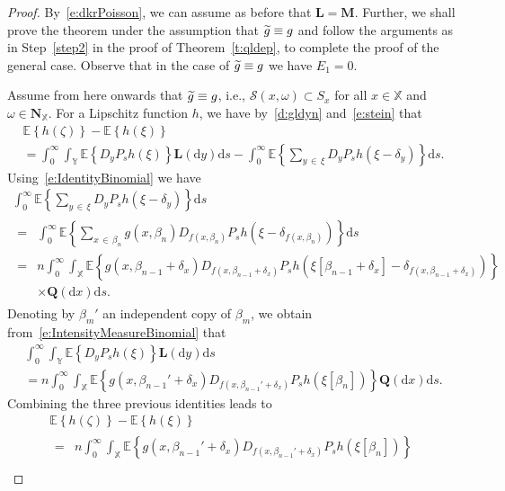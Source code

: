 \documentclass[AHL,Unicode,longabstracts]{cedram}
\newcommand*\bL{\mathbf{L}}
\newcommand*\bM{\mathbf{M}}
\newcommand*\bN{\mathbf{N}}
\newcommand{\bQ}{\mathbf{Q}}
\newcommand*\X{\mathbb{X}}
\newcommand*\Y{\mathbb{Y}}
\newcommand{\E}{\mathbb{E}}
\newcommand*\cS{\mathcal{S}}
\newcommand*\md{\mathrm{d}}
\newcommand{\mean}[1] {\E\left\{{#1}\right\}}
\newcommand{\tg}{\tilde{g}}
\let\oldtilde\tilde
\renewcommand*{\tilde}[1]{\mathchoice{\widetilde{#1}}{\widetilde{#1}}{\oldtilde{#1}}{\oldtilde{#1}}}
\begin{document}
\begin{proof}
By~\eqref{e:dkrPoisson}, we can assume as before that $\bL=\bM$. Further, we shall prove the theorem under the assumption that $\tg \equiv g$ and follow the arguments as in Step~\ref{step2} in the proof of Theorem~\ref{t:qldep}, to complete the proof of the general case. Observe that in the case of $\tg \equiv g$ we have $E_1 = 0$.

Assume from here onwards that $\tg \equiv g$, {i.e., $\cS(x,\omega) \subset S_{x}$} for all $x \in \X$ and {$\omega\in\bN_{\X}$.} For a Lipschitz function $h$, we have by~\eqref{d:gldyn} and~\eqref{e:stein} that
\begin{multline*}
\mean{h(\zeta)} - \mean{h(\xi)}\\
= \int_0^\infty \int_{\Y} \mean{D_yP_sh(\xi)} \bL(\md y) \md s - \int_0^\infty \mean{\sum_{y\,\in\,\xi} D_yP_sh\left(\xi-\delta_y\right)} \md s.
\end{multline*}
Using~\eqref{e:IdentityBinomial} we have
\begin{multline*}
\int_0^\infty \mean{\sum_{y\,\in\,\xi} D_yP_sh\left(\xi-\delta_y\right)} \md s \\
\begin{aligned}
 =& \int_0^\infty \mean{\sum_{x\,\in\,\beta_n} g\left(x,\beta_n\right) D_{f\left(x,\beta_n\right)}P_sh\left(\xi-\delta_{f\left(x,\beta_n\right)}\right)} \md s \\
=&  n \int_0^\infty \int_{\X} \mean{g\left(x,\beta_{n-1}+\delta_x\right) D_{f\left(x,\beta_{n-1}+\delta_x\right)}P_sh\left(\xi\left[\beta_{n-1}+\delta_x\right]-\delta_{f\left(x,\beta_{n-1}+\delta_x\right)}\right)}\\
&\times \bQ(\md x) \md s.
\end{aligned}
\end{multline*}
Denoting by $\beta_m'$ an independent copy of $\beta_m$, we obtain from~\eqref{e:IntensityMeasureBinomial} that
\begin{multline*}
\int_0^\infty \int_{\Y} \mean{D_yP_sh(\xi)} \bL(\md y) \md s\\
 = n \int_0^\infty \int_{\X} \mean{g\left(x,\beta_{n-1}'+\delta_x\right) D_{f\left(x,\beta_{n-1}'+\delta_x\right)}P_sh\left(\xi\left[\beta_n\right]\right)} \bQ(\md x) \md s.
\end{multline*}
Combining the three previous identities leads to
\begin{multline*}
\mean{h(\zeta)} - \mean{h(\xi)}\\
\begin{aligned}
=& n \int_0^\infty \int_{\X} \mean{g\left(x,\beta_{n-1}'+\delta_x\right) D_{f\left(x,\beta_{n-1}'+\delta_x\right)}P_sh\left(\xi\left[\beta_n\right]\right) } \\

\end{aligned}
\end{multline*}
\end{proof}
\end{document}

